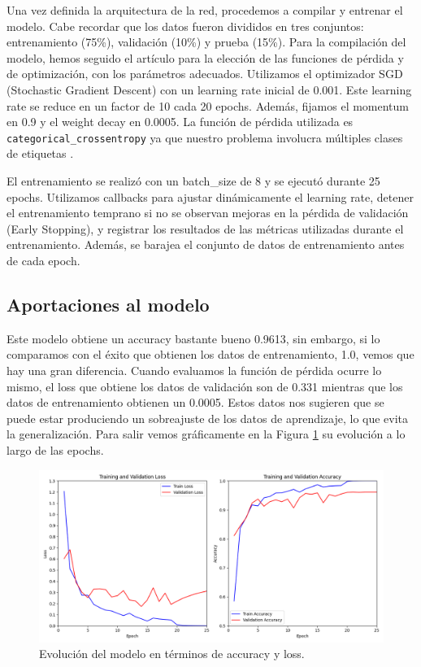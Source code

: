 Una vez definida la arquitectura de la red, procedemos a compilar y entrenar el modelo. Cabe recordar que los datos fueron divididos en tres conjuntos: entrenamiento (75\%), validación (10\%) y prueba (15\%). Para la compilación del modelo, hemos seguido el artículo \citep{kalash2018malware} para la elección de las funciones de pérdida y de optimización, con los parámetros adecuados. Utilizamos el optimizador SGD (Stochastic Gradient Descent) con un learning rate inicial de 0.001. Este learning rate se reduce en un factor de 10 cada 20 epochs. Además, fijamos el momentum en 0.9 y el weight decay en 0.0005. La función de pérdida utilizada es \lstinline|categorical_crossentropy| ya que nuestro problema involucra múltiples clases de etiquetas \citep{categoriCE}.

El entrenamiento se realizó con un batch\_size de 8 y se ejecutó durante 25 epochs. Utilizamos callbacks para ajustar dinámicamente el learning rate, detener el entrenamiento temprano si no se observan mejoras en la pérdida de validación (Early Stopping), y registrar los resultados de las métricas utilizadas durante el entrenamiento. Además, se barajea el conjunto de datos de entrenamiento antes de cada epoch. 


\subsection{Aportaciones al modelo}

Este modelo obtiene un accuracy bastante bueno 0.9613, sin embargo, si lo comparamos con el éxito que obtienen los datos de entrenamiento, 1.0, vemos que hay una gran diferencia. Cuando evaluamos la función de pérdida ocurre lo mismo, el loss que obtiene los datos de validación son de 0.331 mientras que los datos de entrenamiento obtienen un 0.0005. Estos datos nos sugieren que se puede estar produciendo un sobreajuste de los datos de aprendizaje, lo que evita la generalización. Para salir vemos gráficamente en la Figura \ref{img: dropout0} su evolución a lo largo de las epochs.

\begin{figure}[h]
    \begin{center}
    \includegraphics[width=\textwidth]{img/malware_classifier_dropout0.png}
    \end{center}
    \caption{Evolución del modelo en términos de accuracy y loss.}
    \label{img: dropout0}
\end{figure}

